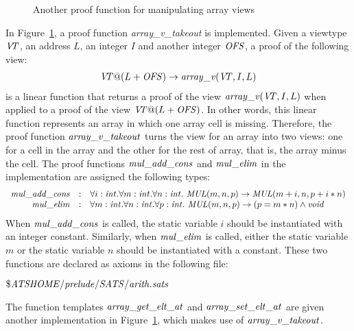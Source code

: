 \begin{figure}

\caption{Another proof function for manipulating array views}
\label{figure:array_v_takeout.dats}
\end{figure}
In Figure~\ref{figure:array_v_takeout.dats}, a proof function {\it
array\_v\_takeout} is implemented.
Given a viewtype ${\it V\!\!T}$, an address $L$, an integer $I$ and another integer
${\it OFS}$, a proof of the following view:
\[\begin{array}{c}
{\it V\!\!T} @ (L+{\it OFS}) \rightarrow {\it array\_v} ({\it V\!\!T}, I, L)
\end{array}\]
is a linear function that returns a proof of the view ${\it array\_v} ({\it V\!\!T},
I, L)$ when applied to a proof of the view $\VT@(L+{\it OFS})$. In other
words, this linear function represents an array in which one array cell is
missing.  Therefore, the proof function ${\it array\_v\_takeout}$ turns the
view for an array into two views: one for a cell in the array and the other
for the rest of array, that is, the array minus the cell.
The proof functions ${\it
mul\_add\_cons}$ and ${\it mul\_elim}$ in the implementation are assigned
the following types:
\[\begin{array}{rcl}
{\it mul\_add\_cons} & : &
\forall i:{\it int}.\forall m:{\it int}.\forall n:{\it int}.~{\it MUL}(m,n,p)\rightarrow {\it MUL}(m+i,n,p+i*n) \\
{\it mul\_elim} & : &
\forall m:{\it int}.\forall n:{\it int}.\forall p:{\it int}.~{\it MUL} (m, n, p)\rightarrow (p = m*n)\land{\it void} \\
\end{array}\]
When ${\it mul\_add\_cons}$ is called, the static variable $i$ should be
instantiated with an integer constant. Similarly, when ${\it mul\_elim}$ is
called, either the static variable $m$ or the static variable $n$ should be
instantiated with a constant. These two functions are declared as axioms in
the following file:
\begin{center}
${\it \$ATSHOME/prelude/SATS/arith.sats}$
\end{center}
The function templates ${\it array\_get\_elt\_at}$ and ${\it
array\_set\_elt\_at}$ are given another implementation in
Figure~\ref{figure:array_v_takeout.dats}, which makes use of ${\it
array\_v\_takeout}$.

